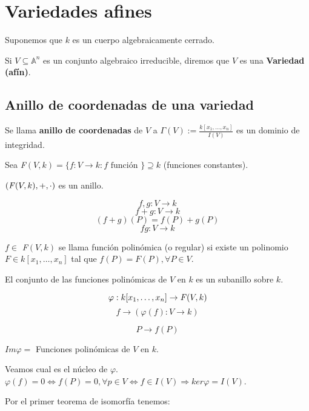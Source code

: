 \chapter{Variedades afines}

Suponemos que $k$ es un cuerpo algebraicamente cerrado. 

\begin{Def}
Si $V\subseteq \mathbb{A}^n$ es un conjunto algebraico irreducible, diremos que $V$ es una \textbf{Variedad (afín)}.
\end{Def}

\section{Anillo de coordenadas de una variedad}


\begin{Def}
Se llama \textbf{anillo de coordenadas} de $V$ a $\Gamma(V):= \frac{k[x_1,\dots,x_n]}{I(V)}$ es un dominio de integridad.
\end{Def}

Sea \textit{F}$(V,k)=\{ f:V\rightarrow k : f \text{ función }\}\supseteq k$ (funciones constantes).

$(\text{\textit{F}}(V,k),+,\cdot)$ es un anillo.

$$f,g:V\rightarrow k$$
$$f+g:V\rightarrow k $$
$$(f+g)(P)=f(P)+g(P)$$
$$fg:V\rightarrow k$$

\begin{Def}
$f\in$ \textit{F}$(V,k)$ se llama función polinómica (o regular) si existe un polinomio $F\in k[x_1,\dots,x_n]$ tal que $f(P)=F(P), \forall P\in V$.
\end{Def}

\begin{nota}
El conjunto de las funciones polinómicas de $V$ en $k$ es un subanillo sobre $k$. 
\end{nota}

$$\varphi : k[x_1,\dots,x_n]\rightarrow \text{\textit{F}}(V,k)$$
$$f \rightarrow (\varphi(f): V \rightarrow k)$$

$$P \rightarrow f(P)$$

$Im\varphi =$ Funciones polinómicas de $V$ en $k$.

Veamos cual es el núcleo de $\varphi $. $\varphi (f)=0 \Leftrightarrow f(P)=0, \forall p \in V \Leftrightarrow f \in I(V) \Rightarrow ker\varphi = I(V)$.

Por el primer teorema de isomorfía tenemos: 

